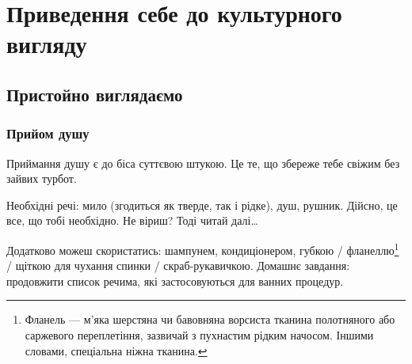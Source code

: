 \part{Приведення себе до культурного вигляду}
\chapter{Пристойно виглядаємо}
\section{Прийом душу}
Приймання душу є до біса суттєвою штукою. Це те, що збереже тебе свіжим без
зайвих турбот.

Необхідні речі: мило (згодиться як тверде, так і рідке), душ, рушник. Дійсно, це
все, що тобі необхідно. Не віриш? Тоді читай далі…

Додатково можеш скористатись: шампунем, кондиціонером, губкою /
фланеллю\footnote{Фланель — м’яка шерстяна чи бавовняна ворсиста тканина полотняного або
саржевого переплетіння, зазвичай з пухнастим рідким начосом. Іншими словами,
спеціальна ніжна тканина.} / щіткою для чухання спинки / скраб-рукавичкою.
Домашнє завдання: продовжити список речима, які застосовуються для ванних
процедур.

